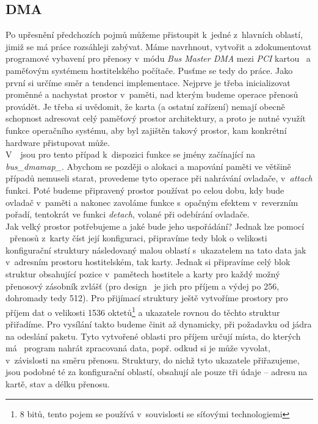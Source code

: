   \subsection{DMA}
  Po upřesnění předchozích pojmů můžeme přistoupit k~jedné z~hlavních
  oblastí, jimiž se má práce rozsáhleji zabývat. Máme navrhnout, vytvořit a
  zdokumentovat programové vybavení pro přenosy v~módu \emph{Bus Master DMA}
  mezi \emph{PCI}
  kartou \comx\ a paměťovým systémem hostitelského počítače. Pusťme se tedy do
  práce. Jako první si určíme směr a tendenci implementace. Nejprve je třeba
  inicializovat proměnné a nachystat prostor v~paměti, nad kterým budeme
  operace přenosů provádět. Je třeba si uvědomit, že karta (a ostatní zařízení)
  nemají obecně schopnost adresovat celý paměťový prostor architektury,
  a proto je nutné
  využít funkce operačního systému, aby byl zajištěn takový prostor, kam
  konkrétní hardware přistupovat může. \\ \indent
  V~\nbsd\ jsou pro tento případ k~dispozici funkce se jmény začínající na
  \emph{bus\_dmamap\_}. Abychom se
  později o alokaci a mapování paměti ve většině případů nemuseli starat,
  provedeme tyto operace při nahrávání ovladače, v~\emph{attach} funkci.
  Poté budeme připravený prostor používat po celou dobu, kdy bude ovladač
  v~paměti a nakonec zavoláme funkce s~opačným efektem v~reverzním pořadí,
  tentokrát ve funkci \emph{detach}, volané při odebírání ovladače. \\ \indent
  Jak velký prostor potřebujeme a jaké bude jeho uspořádání? Jednak lze pomocí
  \dma\ přenosů z~karty číst její konfiguraci, připravíme tedy blok o velikosti
  konfigurační struktury následovaný malou oblastí s~ukazatelem na tato data
  jak v~adresním prostoru hostitelském, tak karty. Jednak si připravíme celý
  blok struktur obsahující pozice v~pamětech hostitele a karty pro každý možný
  přenosový zásobník zvlášť (pro design \nic\ je jich pro příjem a výdej po 256,
  dohromady tedy 512). Pro přijímací struktury ještě vytvoříme prostory pro
  příjem dat o velikosti 1536 oktetů\footnote{8 bitů, tento pojem se používá
  v~souvislosti se síťovými technologiemi} a ukazatele rovnou do těchto
  struktur přiřadíme. Pro vysílání takto
  budeme činit až dynamicky, při požadavku od jádra na odeslání paketu.
  Tyto vytvořené oblasti pro příjem určují místa, do kterých má \ppc\
  program nahrát zpracovaná data, popř. odkud si je
  může vyvolat, v~závislosti na směru přenosu. Struktury, do nichž tyto
  ukazatele přiřazujeme, jsou podobné té
  za konfigurační oblastí, obsahují ale pouze tři údaje -- adresu na kartě,
  stav a délku přenosu.
